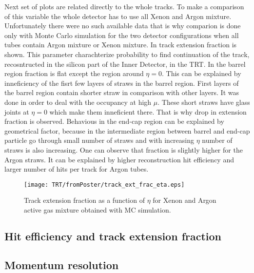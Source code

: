 Next set of plots are related directly to the whole tracks. To make a comparison of this variable the whole detector has to use all Xenon and Argon mixture.
Unfortunately there were no such available data that is why comparion is done only with Monte Carlo simulation for the two detector configurations when 
all tubes contain Argon mixture or Xenon mixture. In  track extension fraction is shown. This parameter charachterize
probability to find continuation of the track, recosntructed in the silicon part of the Inner Detector, in the TRT.
In the barrel region fraction is flat except the region around $\eta = 0$. This can be explained by inneficiency of the fisrt few layers of straws in the barrel region.
First layers of the barrel region contain shorter straw in comparison with other layers. It was done in order to deal with the occupancy at high $\mu$.
These short straws have glass joints at $\eta = 0$ which make them inneficient there. That is why drop in extension fraction is observed.
Behavious in the end-cap region can be explained by geometrical factor, because in the intermediate region between barrel and end-cap particle
go through small number of straws and with increasing $\eta$ number of straws is also increasing.
One can observe that fraction is slightly higher for the Argon straws. It can be explained by higher reconstruction hit efficiency and larger number of hits per
track for Argon tubes.

\begin{figure}
\begin{center}
 \texttt{[image: TRT/fromPoster/track\_ext\_frac\_eta.eps]}
\caption{Track extension fraction as a function of $\eta$ for Xenon and Argon active gas mixture obtained with MC simulation.}
\label{fig:track_ext_fraction}
\end{center}
\end{figure}




\subsection{Hit efficiency and track extension fraction}

\subsection{Momentum resolution}




